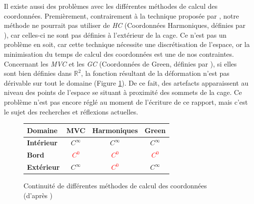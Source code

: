 Il existe aussi des problèmes avec les différentes méthodes de calcul
des coordonnées. Premièrement, contrairement à la technique proposée
par \cite{GPCP13}, notre méthode ne pourrait pas utiliser de
\textit{HC} (Coordonnées Harmoniques, définies par \cite{JMDGS07}),
car celles-ci ne sont pas définies à l'extérieur de la cage. Ce n'est
pas un problème en soit, car cette technique nécessite une
discrétisation de l'espace, or la minimisation du temps de calcul des coordonnées est
une de nos contraintes. Concernant les \textit{MVC} et les \textit{GC}
(Coordonnées de Green, définies par \cite{LLC08}), si elles sont bien
définies dans $\mathbb{R}^2$, la fonction résultant de la déformation
n'est pas dérivable sur tout le domaine (Figure \ref{SURcoo}). De ce
fait, des artefacts apparaissent au niveau des points de l'espace se
situant à proximité des sommets de la cage. Ce problème n'est pas
encore réglé au moment de l'écriture de ce rapport, mais c'est le
sujet des recherches et réflexions actuelles.

\begin{figure}[h]
  \begin{center}
    \begin{tabular}{|l|c|c|c|}
      \hline
      \textbf{Domaine} & MVC & Harmoniques & Green\\
      \hline
      \textbf{Intérieur} & \textcolor{OliveGreen}{$C^\infty$} 
      & \textcolor{OliveGreen}{$C^\infty$} 
      & \textcolor{OliveGreen}{$C^\infty$} \\
      \hline
      \textbf{Bord} & \textcolor{Red}{$C^0$} 
      & \textcolor{Red}{$C^0$} 
      & \textcolor{Red}{$C^0$} \\
      \hline
      \textbf{Extérieur} & \textcolor{OliveGreen}{$C^\infty$} 
      & \textcolor{Red}{$C^0$}
      & \textcolor{OliveGreen}{$C^\infty$} \\
      \hline
    \end{tabular}
    \caption{Continuité de différentes méthodes de calcul des
      coordonnées (d'après \cite{GPCP13})}
    \label{SURcoo}
  \end{center}
\end{figure}



